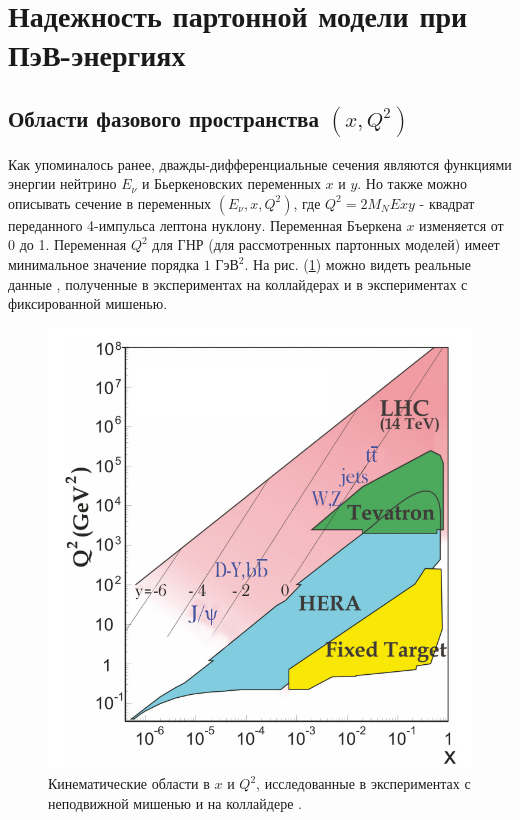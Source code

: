 \section{Надежность партонной модели при ПэВ-энергиях}
\subsection{Области фазового пространства $(x, Q^2)$}
Как упоминалось ранее, дважды-дифференциальные сечения являются функциями энергии нейтрино $E_{\nu}$ и Бьеркеновских переменных $x$ и $y$. Но также можно описывать сечение в переменных $(E_{\nu}, x,Q^2)$, где $Q^2 = 2M_NExy$ - квадрат переданного 4-импульса лептона нуклону. Переменная Бъеркена $x$ изменяется от 0 до 1. Переменная $Q^2$ для ГНР (для рассмотренных партонных моделей) имеет минимальное значение порядка $1$ $\text{ГэВ}^2$. На рис. (\ref{RD}) можно видеть реальные данные \cite{ParticleDataGroup:2024cfk}, полученные в экспериментах на коллайдерах и в экспериментах с фиксированной мишенью.  
\begin{figure}[!h]
\centering
\includegraphics[width=\linewidth]{images/NuProp/reald}
\caption{Кинематические области в $x$ и $Q^2$, исследованные в экспериментах с неподвижной мишенью и на коллайдере \cite{ParticleDataGroup:2024cfk}.}
\label{RD}
\end{figure}
